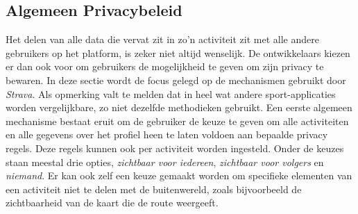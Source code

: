 \subsection{Algemeen Privacybeleid}\label{Algemene Privacy}
Het delen van alle data die vervat zit in zo'n activiteit zit met alle andere
gebruikers op het platform, is zeker niet altijd wenselijk. De ontwikkelaars
kiezen er dan ook voor om gebruikers de mogelijkheid te geven om zijn privacy
te bewaren. In deze sectie wordt de focus gelegd op de mechanismen gebruikt
door \textit{Strava}. Als opmerking valt te melden dat in heel wat andere
sport-applicaties worden vergelijkbare, zo niet dezelfde methodieken gebruikt.
Een eerste algemeen mechanisme bestaat eruit om de gebruiker de keuze te geven
om alle activiteiten en alle gegevens over het profiel heen te laten voldoen
aan bepaalde privacy regels. Deze regels kunnen ook per activiteit worden
ingesteld. Onder de keuzes staan meestal drie opties, \textit{zichtbaar voor
    iedereen}, \textit{zichtbaar voor volgers} en \textit{niemand}. Er kan ook zelf
een keuze gemaakt worden om specifieke elementen van een activiteit niet te
delen met de buitenwereld, zoals bijvoorbeeld de zichtbaarheid van de kaart die
de route weergeeft.\cite{Activity24:online}

